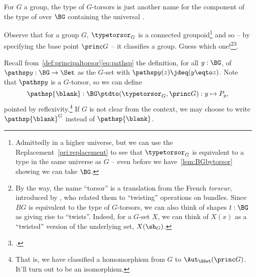 \begin{remark}
  For $G$ a group, the type of $G$-torsors is just another name for the component of the type of \coverings over $\BG$ containing the universal \covering.

  Observe that for a group $G$, $\typetorsor_G$ is a connected groupoid\footnote{Admittedly in a higher universe, but we can use the
    Replacement~\cref{pri:replacement} to see that $\typetorsor_G$ is equivalent
    to a type in the same universe as $G$ -- even before we
    have~\cref{lem:BGbytorsor} showing we can take $\BG$.}
  and so -- by specifying the base point $\princ G$ -- it classifies a group.
  Guess which one!\footnote{%
    By the way, the name ``torsor'' is a translation from the French \emph{torseur},
    introduced by \citeauthor{giraud1971},\footnotemark{} who
    related them to “twisting” operations on bundles.
    Since $BG$ is equivalent to the type of $G$-torsors,
    we can also think of shapes $t:\BG$ as giving rise to “twists”.
    Indeed, for a $G$-set $X$,
    we can think of $X(x)$ as a ``twisted'' version of the underlying set,
    $X(\sh_G)$.}\footcitetext{giraud1971}.
\end{remark}


\begin{definition}
  \label{def:BG2TorsG}
Recall from~\cref{def:principaltorsor}\eqref{eq:pathsp}
the definition, for all $y:\BG$, of $\pathsp y:\BG\to\Set$
as the $G$-set with $\pathsp y(z)\jdeq(y\eqto z)$.
Note that $\pathsp y$ is a $G$-torsor, so we can define
  \[
    \pathsp{\blank}:\BG\ptdto(\typetorsor_G,\princ G): y\mapsto P_y,
  \]
  pointed by reflexivity.\footnote{%
    That is, we have classified a homomorphism from $G$
    to $\Aut_{\GSet}(\princ G)$. It'll turn out to be an isomorphism.}
If $G$ is not clear from the context, 
we may choose to write $\pathsp{\blank}^G$ instead of $\pathsp{\blank}$.
\end{definition}

